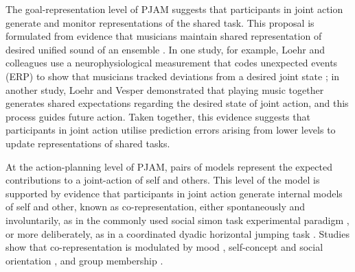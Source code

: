 \begin{CJK}{UTF8}{gbsn}
The goal-representation level of PJAM suggests that participants in joint action generate and monitor representations of the shared task. This proposal is formulated from evidence that musicians maintain shared representation of desired unified sound of an ensemble \citep{Keller2008}.  In one study, for example, Loehr and colleagues  use a neurophysiological measurement that codes unexpected events (ERP) to show that musicians tracked deviations from a desired joint state \citep{Loehr2013}; in another study, Loehr and Vesper \textcite{Loehr2016} demonstrated that playing music together generates shared expectations regarding the desired state of joint action, and this process guides future action.  Taken together, this evidence suggests that participants in joint action utilise prediction errors arising from lower levels to update representations of shared tasks.

At the action-planning level of PJAM, pairs of models represent the expected contributions to a joint-action of self and others.  This level of the model is supported by evidence that participants in joint action generate internal models of self and other, known as co-representation, either spontaneously and involuntarily, as in the commonly used social simon task experimental paradigm \citep{Sebanz2003,Atmaca2008}, or more deliberately, as in a coordinated dyadic horizontal jumping task \citep{Vesper2012}.  Studies show that co-representation is modulated by mood \citep[positive or negative affect, see][]{Kuhbandner2010}, self-concept and social orientation \citep{Colzato2012,Colzato2012a}, and group membership \citep{DeBruijn2008,Iani2013}.


\end{CJK}
